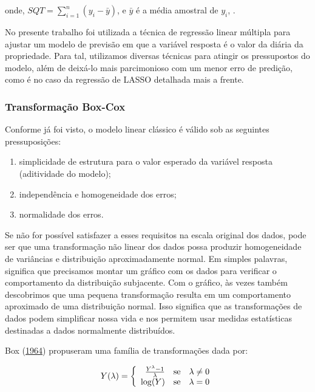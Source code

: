 \documentclass[
	12pt,				%
	a4paper,		%
	oneside,    %
	chapter=TITLE,		   %
	section=TITLE,		   %
	subsection=TITLE,	   %
	subsubsection=TITLE, %
	english,			%
	french,				%
	spanish,			%
	brazil,				%
]{abntex2}
\begin{document}
\noindent onde, \(SQT=\sum_{i=1}^n(y_i-\bar{y})\), e \(\bar{y}\) é a
média amostral de \(y_i\), .

No presente trabalho foi utilizada a técnica de regressão linear
múltipla para ajustar um modelo de previsão em que a variável resposta é
o valor da diária da propriedade. Para tal, utilizamos diversas técnicas
para atingir os pressupostos do modelo, além de deixá-lo mais
parcimonioso com um menor erro de predição, como é no caso da regressão
de LASSO detalhada mais a frente.

\hypertarget{transformauxe7uxe3o-box-cox}{%
\subsubsection{Transformação
Box-Cox}\label{transformauxe7uxe3o-box-cox}}

Conforme já foi visto, o modelo linear clássico é válido sob as
seguintes pressuposições:

\begin{enumerate}[label=(\roman*)]
\item simplicidade de estrutura para o valor esperado da variável resposta (aditividade do modelo);
\item independência e homogeneidade dos erros;
\item normalidade dos erros.
\end{enumerate}

Se não for possível satisfazer a esses requisitos na escala original dos
dados, pode ser que uma transformação não linear dos dados possa
produzir homogeneidade de variâncias e distribuição aproximadamente
normal. Em simples palavras, significa que precisamos montar um gráfico
com os dados para verificar o comportamento da distribuição subjacente.
Com o gráfico, às vezes também descobrimos que uma pequena transformação
resulta em um comportamento aproximado de uma distribuição normal. Isso
significa que as transformações de dados podem simplificar nossa vida e
nos permitem usar medidas estatísticas destinadas a dados normalmente
distribuídos.

Box (\protect\hyperlink{ref-box1964analysis}{1964}) propuseram uma
família de transformações dada por:

\[Y(\lambda)
= \left\{ \begin{array}{rll}
\frac{Y^{\lambda}-1}{\lambda} & \hbox{se} & \lambda \neq 0 \\
\log(Y) & \hbox{se} & \lambda = 0
\end{array}\right.\]
\end{document}
